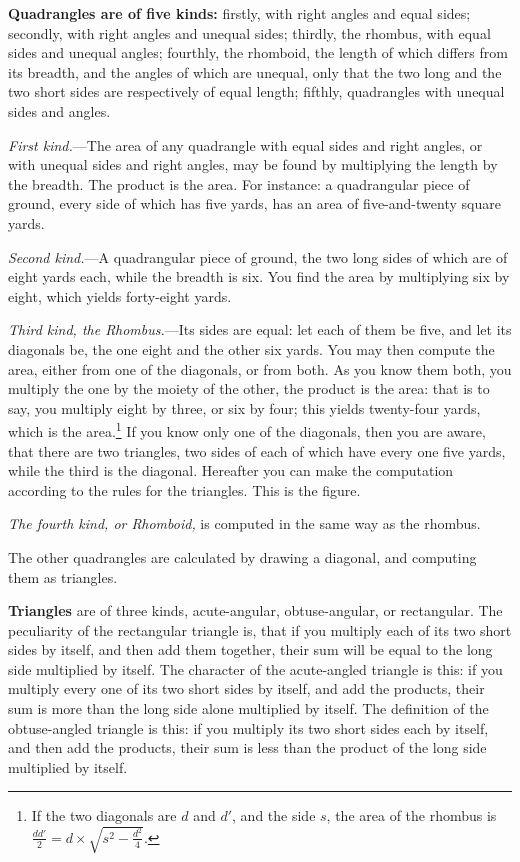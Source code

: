 \vspace{0.3cm}
\noindent\textbf{Quadrangles are of five kinds:} firstly, with right angles and equal sides; secondly, with right angles and unequal sides; thirdly, the rhombus, with equal sides and unequal angles; fourthly, the rhomboid, the length of which differs from its breadth, and the angles of which are unequal, only that the two long and the two short sides are respectively of equal length; fifthly, quadrangles with unequal sides and angles.

\textit{First kind.}---The area of any quadrangle with equal sides and right angles, or with unequal sides and right angles, may be found by multiplying the length by the breadth. The product is the area. For instance: a quadrangular piece of ground, every side of which has five yards, has an area of five-and-twenty square yards.

\textit{Second kind.}---A quadrangular piece of ground, the two long sides of which are of eight yards each, while the breadth is six. You find the area by multiplying six by eight, which yields forty-eight yards.

\textit{Third kind, the Rhombus.}---Its sides are equal: let each of them be five, and let its diagonals be, the one eight and the other six yards. You may then compute the area, either from one of the diagonals, or from both. As you know them both, you multiply the one by the moiety of the other, the product is the area: that is to say, you multiply eight by three, or six by four; this yields twenty-four yards, which is the area.\footnote{If the two diagonals are $d$ and $d'$, and the side $s$, the area of the rhombus is $\frac{dd'}{2} = d \times \sqrt{s^2 - \frac{d^2}{4}}$.} If you know only one of the diagonals, then you are aware, that there are two triangles, two sides of each of which have every one five yards, while the third is the diagonal. Hereafter you can make the computation according to the rules for the triangles. This is the figure.

\textit{The fourth kind, or Rhomboid,} is computed in the same way as the rhombus.

The other quadrangles are calculated by drawing a diagonal, and computing them as triangles.

\vspace{0.3cm}
\noindent\textbf{Triangles} are of three kinds, acute-angular, obtuse-angular, or rectangular. The peculiarity of the rectangular triangle is, that if you multiply each of its two short sides by itself, and then add them together, their sum will be equal to the long side multiplied by itself. The character of the acute-angled triangle is this: if you multiply every one of its two short sides by itself, and add the products, their sum is more than the long side alone multiplied by itself. The definition of the obtuse-angled triangle is this: if you multiply its two short sides each by itself, and then add the products, their sum is less than the product of the long side multiplied by itself.

